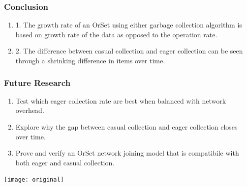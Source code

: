 \documentclass{beamer}
\begin{document}
    \begin{frame}
        \frametitle{Conclusion}

        \begin{center}
        \begin{minipage}{4in}
        \begin{enumerate}
            \item 1. The growth rate of an OrSet using either garbage
                collection algorithm is based on growth rate of
                the data as opposed to the operation rate.
            \bigskip
            \item 2. The difference between casual collection and eager
                collection can be seen through a shrinking difference in
                items over time.
        \end{enumerate}
        \end{minipage}
        \end{center}

    \end{frame}

    \begin{frame}
        \frametitle{Future Research}

        \begin{center}
        \begin{minipage}{4in}
        \begin{enumerate}
            \item Test which eager collection rate are best when
                balanced with network overhead.
            \bigskip
            \item Explore why the gap between casual collection and eager
                collection closes over time.
            \bigskip
            \item Prove and verify an OrSet network joining model that
                is compatibile with both eager and casual collection.
        \end{enumerate}
        \end{minipage}
        \end{center}
    \end{frame}

    \begin{frame}
        \texttt{[image: original]}
    \end{frame}
\end{document}
